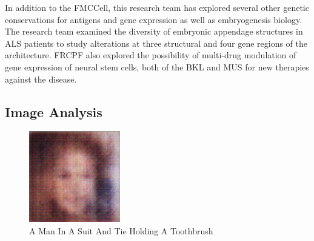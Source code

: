 \documentclass{article}%
\begin{document}
In addition to the FMCCell, this research team has explored several other genetic conservations for antigens and gene expression as well as embryogenesis biology. The research team examined the diversity of embryonic appendage structures in ALS patients to study alterations at three structural and four gene regions of the architecture.\newline%
FRCPF also explored the possibility of multi{-}drug modulation of gene expression of neural stem cells, both of the BKL and MUS for new therapies against the disease.

%
\subsection{Image Analysis}%
\label{subsec:ImageAnalysis}%


\begin{figure}[h!]%
\centering%
\includegraphics[width=150px]{500_fake_images/samples_5_175.png}%
\caption{A Man In A Suit And Tie Holding A Toothbrush}%
\end{figure}

%
\end{document}

